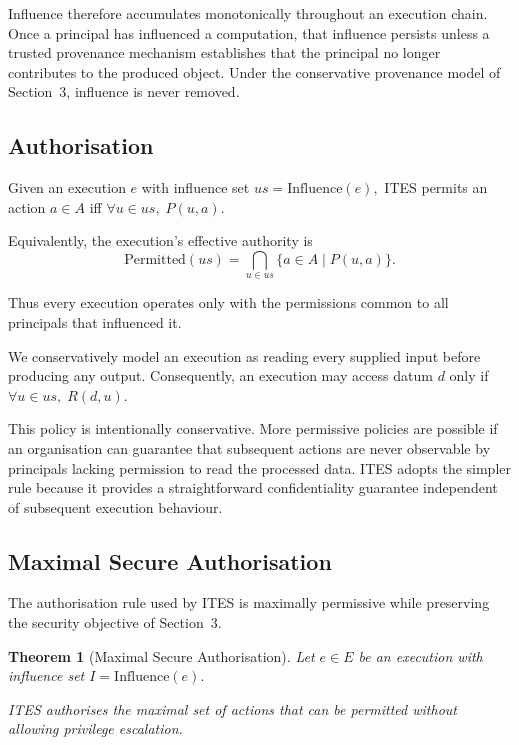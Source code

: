\documentclass{article} %
\newtheorem{theorem}{Theorem}
\begin{document}
Influence therefore accumulates monotonically throughout an execution chain. Once a principal has influenced a computation, that influence persists unless a trusted provenance mechanism establishes that the principal no longer contributes to the produced object. Under the conservative provenance model of Section~3, influence is never removed.

\subsection{Authorisation}

Given an execution \(e\) with influence set \(us=\mathrm{Influence}(e),\)
ITES permits an action
\(a\in A\)
iff
\(
\forall u\in us,\;P(u,a).
\)

Equivalently, the execution's effective authority is
\[
\mathrm{Permitted}(us)
=
\bigcap_{u\in us}
\{a\in A\mid P(u,a)\}.
\]

Thus every execution operates only with the permissions common to all principals that influenced it.

We conservatively model an execution as reading every supplied input before producing any output. Consequently, an execution may access datum \(d\) only if
\(
\forall u\in us,\;R(d,u).
\)

This policy is intentionally conservative. More permissive policies are possible if an organisation can guarantee that subsequent actions are never observable by principals lacking permission to read the processed data. ITES adopts the simpler rule because it provides a straightforward confidentiality guarantee independent of subsequent execution behaviour.

\subsection{Maximal Secure Authorisation}

The authorisation rule used by ITES is maximally permissive while preserving the security objective of Section~3.

\begin{theorem}[Maximal Secure Authorisation]
Let \(e\in E\) be an execution with influence set
\(
I=\mathrm{Influence}(e).
\)

ITES authorises the maximal set of actions that can be permitted without allowing privilege escalation.
\end{theorem}
\end{document}
